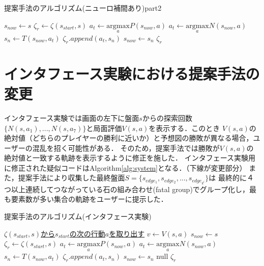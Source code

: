 \begin{algorithm}
    \caption{提案手法のアルゴリズム(ニューロ補間あり)part2}
    \label{alg:neuro-2}
    \begin{algorithmic}[1] 
        \State $s_{now} \gets s$
        \State $\zeta_r \gets \zeta(s_{start}, s)$
                \State \underline{$a_t \gets {\underset{a}{\textrm{argmax}}} P(s_{now}, a)$}
            \Else
                \State $a_t \gets {\underset{a}{\textrm{argmax}}} N(s_{now}, a)$
            \EndIf
            \State $s_n \gets T(s_{now}, a_t)$
            \State $\zeta_r.append({a_t, s_n})$
            \State $s_{now} \gets s_n$
        \EndWhile
        \Return $\zeta_r$
        \EndFunction
       
        
    \end{algorithmic}
\end{algorithm}
\section{インタフェース実験における提案手法の変更}
\label{sec:fix}
インタフェース実験では画面の左下に盤面$s$からの探索回数$\{N(s, a_1), ..., N(s, a_7)\}$と局面評価$V(s, a)$を表示する．このとき
$V(s, a)$の絶対値（どちらのプレイヤーの勝利に近いか）と予想図の勝敗が異なる場合，ユーザーの混乱を招く可能性がある．
そのため，提案手法では勝敗が$V(s, a)$の絶対値と一致する軌跡を表示するように修正を施した．
インタフェース実験用に修正された疑似コードはAlgorithm\ref{alg:system}となる．（下線が変更部分）
また，提案手法により収集した最終盤面$S=\{s_{edge_1}, s_{edge_2}, ..., s_{edge_{k^l}}\}$は
最終的に４つ以上連続してつながっている石の組み合わせ(fatal group)でグループ化し，最も要素数が多い集合の軌跡をユーザーに提示した．

\begin{algorithm}
    \caption{提案手法のアルゴリズム(インタフェース実験)}
    \label{alg:system}
    \begin{algorithmic}[1]       
        
        \State  \underline{$\zeta(s_{start}, s)$から$s_{start}$の次の行動$a$を取り出す}
        \State \underline{$v \gets V(s, a)$}
        \State $s_{now} \gets s$
        \State $\zeta_r \gets \zeta(s_{start}, s)$
                \State \underline{$a_t \gets {\underset{a}{\textrm{argmax}}} P(s_{now}, a)$}
            \Else
                \State $a_t \gets {\underset{a}{\textrm{argmax}}} N(s_{now}, a)$
            \EndIf
            \State $s_n \gets T(s_{now}, a_t)$
            \State $\zeta_r.append({a_t, s_n})$
            \State $s_{now} \gets s_n$
        \EndWhile
           \Return null
        \EndIf
        \Return $\zeta_r$
        \EndFunction
       
        
    \end{algorithmic}
\end{algorithm}
